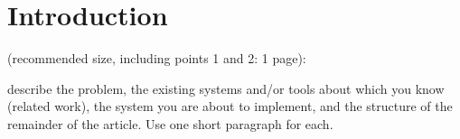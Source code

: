 \section{Introduction}

(recommended size, including points 1 and 2: 1 page):

describe the
problem, the existing systems and/or tools about which you know (related work), the
system you are about to implement, and the structure of the remainder of the article.
Use one short paragraph for each.